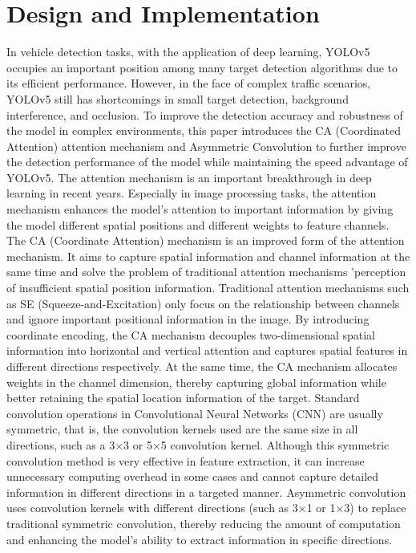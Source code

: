 \documentclass[conference]{IEEEtran}
\begin{document}
\section{Design and Implementation}
In vehicle detection tasks, with the application of deep learning, YOLOv5 occupies an important position among many target detection algorithms due to its efficient performance. However, in the face of complex traffic scenarios, YOLOv5 still has shortcomings in small target detection, background interference, and occlusion. To improve the detection accuracy and robustness of the model in complex environments, this paper introduces the CA (Coordinated Attention) attention mechanism and Asymmetric Convolution to further improve the detection performance of the model while maintaining the speed advantage of YOLOv5.
The attention mechanism is an important breakthrough in deep learning in recent years. Especially in image processing tasks, the attention mechanism enhances the model's attention to important information by giving the model different spatial positions and different weights to feature channels. The CA (Coordinate Attention) mechanism is an improved form of the attention mechanism. It aims to capture spatial information and channel information at the same time and solve the problem of traditional attention mechanisms 'perception of insufficient spatial position information.
Traditional attention mechanisms such as SE (Squeeze-and-Excitation) only focus on the relationship between channels and ignore important positional information in the image. By introducing coordinate encoding, the CA mechanism decouples two-dimensional spatial information into horizontal and vertical attention and captures spatial features in different directions respectively. At the same time, the CA mechanism allocates weights in the channel dimension, thereby capturing global information while better retaining the spatial location information of the target.
Standard convolution operations in Convolutional Neural Networks (CNN) are usually symmetric, that is, the convolution kernels used are the same size in all directions, such as a 3×3 or 5×5 convolution kernel. Although this symmetric convolution method is very effective in feature extraction, it can increase unnecessary computing overhead in some cases and cannot capture detailed information in different directions in a targeted manner. Asymmetric convolution uses convolution kernels with different directions (such as 3×1 or 1×3) to replace traditional symmetric convolution, thereby reducing the amount of computation and enhancing the model's ability to extract information in specific directions.
\end{document}
